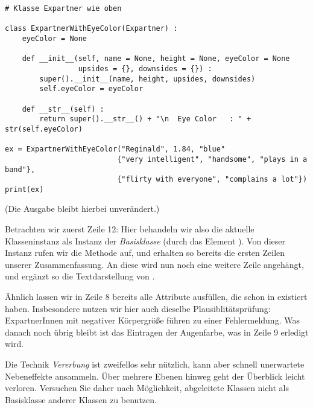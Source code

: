 \begin{codebox}
\begin{verbatim}
# Klasse Expartner wie oben

class ExpartnerWithEyeColor(Expartner) :
    eyeColor = None
    
    def __init__(self, name = None, height = None, eyeColor = None
                 upsides = {}, downsides = {}) :
        super().__init__(name, height, upsides, downsides)
        self.eyeColor = eyeColor
        
    def __str__(self) :
        return super().__str__() + "\n  Eye Color   : " + str(self.eyeColor)

ex = ExpartnerWithEyeColor("Reginald", 1.84, "blue"
                          {"very intelligent", "handsome", "plays in a band"},
                          {"flirty with everyone", "complains a lot"})
print(ex)
\end{verbatim}
\end{codebox}
(Die Ausgabe bleibt hierbei unverändert.)

Betrachten wir zuerst Zeile 12: Hier behandeln wir also die aktuelle Klasseninstanz  als Instanz der \emph{Basisklasse}   (durch das Element ). Von dieser Instanz rufen wir die Methode  auf, und erhalten so bereits die ersten Zeilen unserer Zusammenfassung. An diese wird nun noch eine weitere Zeile angehängt, und ergänzt so die Textdarstellung von .

Ähnlich lassen wir in Zeile 8 bereits alle Attribute ausfüllen, die schon in  existiert haben. Insbesondere nutzen wir hier auch dieselbe Plausiblitätsprüfung: ExpartnerInnen mit negativer Körpergröße führen zu einer Fehlermeldung. Was danach noch übrig bleibt ist das Eintragen der Augenfarbe, was in Zeile 9 erledigt wird.

\begin{hintbox}
Die Technik \emph{Vererbung} ist zweifellos sehr nützlich, kann aber schnell unerwartete Nebeneffekte ansammeln. Über mehrere Ebenen hinweg geht der Überblick leicht verloren. Versuchen Sie daher nach Möglichkeit, abgeleitete Klassen nicht als Basisklasse anderer Klassen zu benutzen.
\end{hintbox}